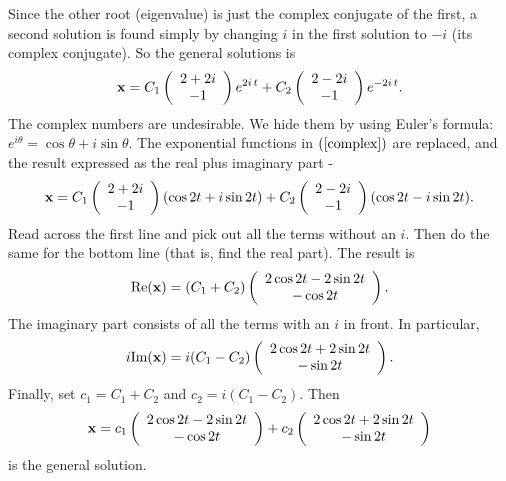 \documentclass[leqno,DIV=calc,paper=a4,fontsize=11pt]{article}
\theoremstyle{definition}
\theoremstyle{plain}
\theoremstyle{remark}
\newcommand{\R}[1]{$(\ref{#1})$}
\begin{document}
Since the other root (eigenvalue) is just the complex conjugate of the
first, a second solution is found simply by changing $i$ in the first
solution to $-i$ (its complex conjugate). So the general solutions is
\begin{equation}
{\bf x} =
C_1\left(\begin{array}{c}2+2i\\-1\end{array}\right)e^{2i\,t}
+C_2\left(\begin{array}{c}2-2i\\-1\end{array}\right)e^{-2i\,t}.
\label{complex}
\end{equation}
The complex numbers are undesirable. We hide them by using Euler's
formula: $e^{i\theta}=\cos\theta+i\sin\theta$. The exponential
functions in \R{complex} are replaced, and the result expressed
as the real plus imaginary part -
\[
{\bf x} =
C_1\left(\begin{array}{c}2+2i\\-1\end{array}\right)(\cos 2t+i\sin 2t)
+C_2\left(\begin{array}{c}2-2i\\-1\end{array}\right)(\cos 2t-i\sin 2t).
\]
Read across the first line and pick out all the terms without an
$i$. Then do the same for the bottom line (that is, find the real
part). The result is
\[
\mbox{Re}({\bf x}) = (C_1+C_2)\left(\begin{array}{c}
2\cos 2t-2\sin 2t\\
-\cos 2t\end{array}\right).
\]
The imaginary part consists of all the terms with an $i$ in
front. In particular,
\[
i\mbox{Im}({\bf x}) = i(C_1-C_2)\left(\begin{array}{c}
2\cos 2t+2\sin 2t\\
-\sin 2t\end{array}\right).
\]
Finally, set $c_1=C_1+C_2$ and $c_2=i(C_1-C_2)$. Then
\[
{\bf x} = c_1\left(\begin{array}{c}
2\cos 2t-2\sin 2t\\
-\cos 2t\end{array}\right)+
c_2\left(\begin{array}{c}
2\cos 2t+2\sin 2t\\
-\sin 2t\end{array}\right)
\]
is the general solution.
\end{document}
